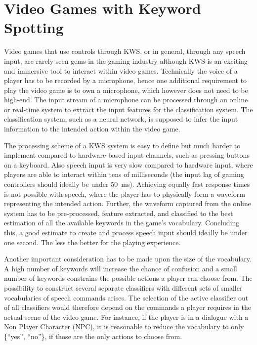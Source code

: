 
\section{Video Games with Keyword Spotting}\label{sec:intro_games}
Video games that use controls through KWS, or in general, through any speech input, are rarely seen gems in the gaming industry although KWS is an exciting and immersive tool to interact within video games.
Technically the voice of a player has to be recorded by a microphone, hence one additional requirement to play the video game is to own a microphone, which however does not need to be high-end.
The input stream of a microphone can be processed through an online or real-time system to extract the input features for the classification system.
The classification system, such as a neural network, is supposed to infer the input information to the intended action within the video game.

The processing scheme of a KWS system is easy to define but much harder to implement compared to hardware based input channels, such as pressing buttons on a keyboard.
Also speech input is very slow compared to hardware input, where players are able to interact within tens of milliseconds (the input lag of gaming controllers should ideally be under \SI{50}{\milli\second}).
Achieving equally fast response times is not possible with speech, where the player has to physically form a waveform representing the intended action.
Further, the waveform captured from the online system has to be pre-processed, feature extracted, and classified to the best estimation of all the available keywords in the game's vocabulary.
Concluding this, a good estimate to create and process speech input should ideally be under one second. 
The less the better for the playing experience.

Another important consideration has to be made upon the size of the vocabulary.
A high number of keywords will increase the chance of confusion and a small number of keywords constrains the possible actions a player can choose from.
The possibility to construct several separate classifiers with different sets of smaller vocabularies of speech commands arises.
The selection of the active classifier out of all classifiers would therefore depend on the commands a player requires in the actual scene of the video game.
For instance, if the player is in a dialogue with a Non Player Character (NPC), it is reasonable to reduce the vocabulary to only \{\enquote{yes}, \enquote{no}\}, if those are the only actions to choose from.

